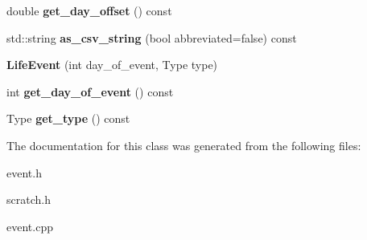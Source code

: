 \begin{DoxyCompactItemize}
\mbox{\label{class_event_ae6a5c791f9bdfbf9f5b46ccb054a2edd}} 
double {\bfseries get\+\_\+day\+\_\+offset} () const
\item 
\mbox{\label{class_event_a8d73661ed32c9313e521067847241a7a}} 
std\+::string {\bfseries as\+\_\+csv\+\_\+string} (bool abbreviated=false) const
\item 
\mbox{\label{class_event_a6c070e8addea9b6ac56b382c9fc493c8}} 
{\bfseries Life\+Event} (int day\+\_\+of\+\_\+event, Type type)
\item 
\mbox{\label{class_event_a34f44553c3bf19dda43d6e176b577e26}} 
int {\bfseries get\+\_\+day\+\_\+of\+\_\+event} () const
\item 
\mbox{\label{class_event_a539fbcc1024a8081cb36b0f27ae4e379}} 
Type {\bfseries get\+\_\+type} () const
\end{DoxyCompactItemize}


The documentation for this class was generated from the following files\+:\begin{DoxyCompactItemize}
\item 
event.\+h\item 
scratch.\+h\item 
event.\+cpp\end{DoxyCompactItemize}
